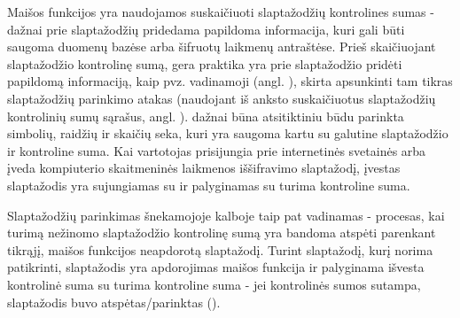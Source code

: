 \documentclass{VUMIFInfBakalaurinis}
\begin{document}
Maišos funkcijos yra naudojamos suskaičiuoti slaptažodžių kontrolines sumas - 
dažnai prie slaptažodžių pridedama papildoma informacija, kuri gali būti saugoma 
duomenų bazėse arba šifruotų laikmenų antraštėse. Prieš skaičiuojant 
slaptažodžio kontrolinę sumą, gera praktika yra prie slaptažodžio pridėti 
papildomą informaciją, kaip pvz. vadinamoji  (angl. 
), skirta apsunkinti tam tikras slaptažodžių parinkimo atakas 
(naudojant iš anksto suskaičiuotus slaptažodžių kontrolinių sumų sąrašus, angl. 
).  dažnai būna atsitiktiniu būdu
parinkta simbolių, raidžių ir skaičių seka, kuri yra saugoma kartu su galutine 
slaptažodžio ir  kontroline suma. Kai vartotojas prisijungia 
prie internetinės svetainės arba įveda kompiuterio skaitmeninės laikmenos 
iššifravimo slaptažodį, įvestas slaptažodis yra sujungiamas su 
 ir palyginamas su turima kontroline suma.

Slaptažodžių parinkimas šnekamojoje kalboje taip pat vadinamas 
 - procesas, kai turimą nežinomo slaptažodžio 
kontrolinę sumą yra bandoma atspėti parenkant tikrąjį, maišos funkcijos 
neapdorotą slaptažodį. Turint slaptažodį, kurį norima patikrinti, slaptažodis 
yra apdorojimas maišos funkcija ir palyginama išvesta kontrolinė suma su turima 
kontroline suma - jei kontrolinės sumos sutampa, slaptažodis buvo 
atspėtas/parinktas ().
\end{document}
